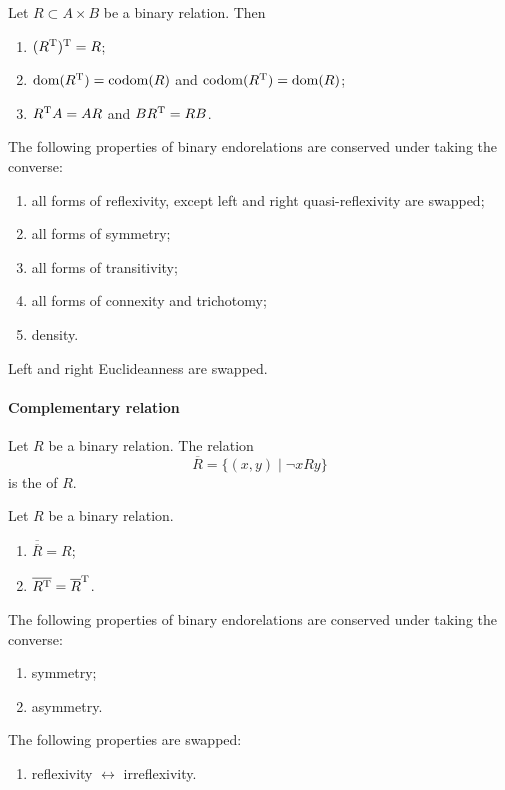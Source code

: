 \begin{lemma}
Let $R\subset A\times B$ be a binary relation. Then
\begin{enumerate}
\item $(R^{\mathrm{T}})^{\mathrm{T}} = R$;
\item $\operatorname{dom}(R^{\mathrm{T}}) = \operatorname{codom}(R)$ and $\operatorname{codom}(R^{\mathrm{T}}) = \operatorname{dom}(R)$;
\item $R^{\mathrm{T}} A = AR$ and $BR^{\mathrm{T}} = RB$.
\end{enumerate}
\end{lemma}

\begin{lemma}
The following properties of binary endorelations are conserved under taking the converse:
\begin{enumerate}
\item all forms of reflexivity, except left and right quasi-reflexivity are swapped;
\item all forms of symmetry;
\item all forms of transitivity;
\item all forms of connexity and trichotomy;
\item density.
\end{enumerate}
Left and right Euclideanness are swapped.
\end{lemma}
\paragraph{Complementary relation}
\begin{definition}
Let $R$ be a binary relation. The relation
\[ \overline{R} = \{(x,y)\;|\; \neg xRy\} \]
is the  of $R$.
\end{definition}
\begin{lemma}
Let $R$ be a binary relation.
\begin{enumerate}
\item $\overline{\overline{R}} = R$;
\item $\overline{R^{\mathrm{T}}} = \overline{R}^{\mathrm{T}}$.
\end{enumerate}
\end{lemma}
\begin{lemma}
The following properties of binary endorelations are conserved under taking the converse:
\begin{enumerate}
\item symmetry;
\item asymmetry.
\end{enumerate}
The following properties are swapped:
\begin{enumerate}
\item reflexivity $\leftrightarrow$ irreflexivity.
\end{enumerate}
\end{lemma}
